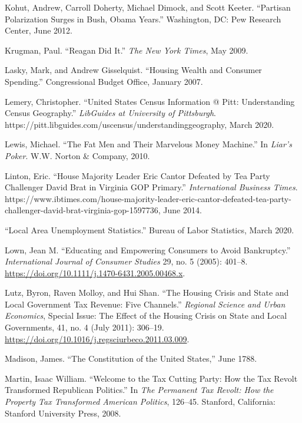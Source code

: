 \documentclass[12pt,oneside]{psthesis}
\begin{document}
\leavevmode\hypertarget{ref-kohut2012partisan}{}%
Kohut, Andrew, Carroll Doherty, Michael Dimock, and Scott Keeter. ``Partisan Polarization Surges in Bush, Obama Years.'' Washington, DC: Pew Research Center, June 2012.

\leavevmode\hypertarget{ref-krugman2009reagan}{}%
Krugman, Paul. ``Reagan Did It.'' \emph{The New York Times}, May 2009.

\leavevmode\hypertarget{ref-lasky2007housing}{}%
Lasky, Mark, and Andrew Gisselquist. ``Housing Wealth and Consumer Spending.'' Congressional Budget Office, January 2007.

\leavevmode\hypertarget{ref-lemery2020united}{}%
Lemery, Christopher. ``United States Census Information @ Pitt: Understanding Census Geography.'' \emph{LibGuides at University of Pittsburgh}. https://pitt.libguides.com/uscensus/understandinggeography, March 2020.

\leavevmode\hypertarget{ref-lewis2010fat}{}%
Lewis, Michael. ``The Fat Men and Their Marvelous Money Machine.'' In \emph{Liar's Poker}. W.W. Norton \& Company, 2010.

\leavevmode\hypertarget{ref-linton2014house}{}%
Linton, Eric. ``House Majority Leader Eric Cantor Defeated by Tea Party Challenger David Brat in Virginia GOP Primary.'' \emph{International Business Times}. https://www.ibtimes.com/house-majority-leader-eric-cantor-defeated-tea-party-challenger-david-brat-virginia-gop-1597736, June 2014.

\leavevmode\hypertarget{ref-2020local}{}%
``Local Area Unemployment Statistics.'' Bureau of Labor Statistics, March 2020.

\leavevmode\hypertarget{ref-lown2005educating}{}%
Lown, Jean M. ``Educating and Empowering Consumers to Avoid Bankruptcy.'' \emph{International Journal of Consumer Studies} 29, no. 5 (2005): 401--8. \url{https://doi.org/10.1111/j.1470-6431.2005.00468.x}.

\leavevmode\hypertarget{ref-lutz2011housing}{}%
Lutz, Byron, Raven Molloy, and Hui Shan. ``The Housing Crisis and State and Local Government Tax Revenue: Five Channels.'' \emph{Regional Science and Urban Economics}, Special Issue: The Effect of the Housing Crisis on State and Local Governments, 41, no. 4 (July 2011): 306--19. \url{https://doi.org/10.1016/j.regsciurbeco.2011.03.009}.

\leavevmode\hypertarget{ref-madison1788constitution}{}%
Madison, James. ``The Constitution of the United States,'' June 1788.

\leavevmode\hypertarget{ref-martin2008welcome}{}%
Martin, Isaac William. ``Welcome to the Tax Cutting Party: How the Tax Revolt Transformed Republican Politics.'' In \emph{The Permanent Tax Revolt: How the Property Tax Transformed American Politics}, 126--45. Stanford, California: Stanford University Press, 2008.
\end{document}
